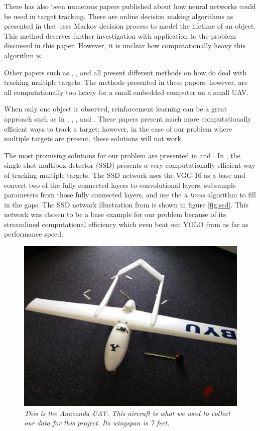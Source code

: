 \documentclass[letterpaper, 10 pt, conference]{ieeeconf}  %
\begin{document}
There has also been numerous papers published about how neural networks could be used in target tracking. There are online decision making algorithms as presented in \cite{xiang2015learning} that uses Markov decision process to model the lifetime of an object. This method deserves further investigation with application to the problem discussed in this paper. However, it is unclear how computationally heavy this algorithm is. 

Other papers such as \cite{sadeghian2017tracking}, \cite{choi2015near}, and \cite{keuper2016multi} all present different methods on how do deal with tracking multiple targets. The methods presented in these papers, however, are all computationally too heavy for a small embedded computer on a small UAV.

When only one object is observed, reinforcement learning can be a great approach such as in \cite{zhang2017deep}, \cite{choi2017visual}, \cite{yoo2017action}, and \cite{luo2017end}. These papers present much more computationally efficient ways to track a target; however, in the case of our problem where multiple targets are present, these solutions will not work.

The most promising solutions for our problem are presented in \cite{liu2016ssd} and \cite{redmon2016you}. In \cite{liu2016ssd}, the single shot multibox detector (SSD) presents a very computationally efficient way of tracking multiple targets. The SSD network uses the VGG-16 as a base and convert two of the fully connected layers to convolutional layers, subsample parameters from those fully connected layers, and use the \textit{a trous} algorithm \cite{holschneider1990real} to fill in the gaps. The SSD network illustration from \cite{liu2016ssd} is shown in figure \ref{fig:ssd}. This network was chosen to be a base example for our problem because of its streamlined computational efficiency which even beat out YOLO from \cite{redmon2016you} as far as performance speed.

\begin{figure}
	\begin{center}
		\includegraphics[width=.45\textwidth]{anaconda.jpg}
		\caption{\textit{This is the Anaconda UAV. This aircraft is what we used to collect our data for this project. Its wingspan is 7 feet.}} 
		\label{fig:anaconda}
	\end{center}
\end{figure}
\end{document}

